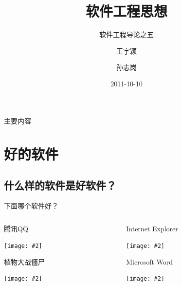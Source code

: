 \documentclass[]{beamer}
\title[Thinking in SE]
{软件工程思想}
\subtitle
{软件工程导论之五} %
\author[\url{http://sunner.cn}] %
{王宇颖 \and 孙志岗}
\institute[哈尔滨工业大学] %
{
  计算机科学与技术学院\\
  哈尔滨工业大学}
\date[Short Occasion] %
{2011-10-10}
\begin{document}
\begin{frame}
  \titlepage
\end{frame}

\begin{frame}{主要内容}
  \tableofcontents
\end{frame}




\section{好的软件}

\subsection[什么是好软件]{什么样的软件是好软件？}

\newenvironment{iconblock}[2]{
    \begin{block}{#1}
    \begin{center}
    \texttt{[image: \#2]}}
{\end{center}
    \end{block}
}

\begin{frame}{下面哪个软件好？}
  \begin{columns}[T]
    \begin{column}{4cm}
      \begin{iconblock}{腾讯QQ}{qq.jpg}\end{iconblock}
      \begin{iconblock}{植物大战僵尸}{pvz.jpg}\end{iconblock}
    \end{column}
    \begin{column}{4cm}
      \begin{iconblock}{Internet Explorer}{ie.png}\end{iconblock}
      \begin{iconblock}{Microsoft Word}{word.png}\end{iconblock}
    \end{column}
  \end{columns}

\end{frame}
\end{document}
